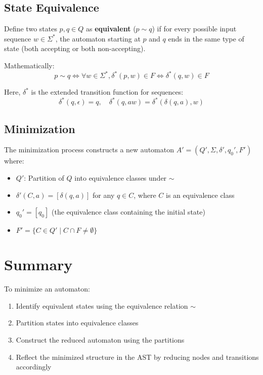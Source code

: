 \documentclass{article}
\begin{document}
\subsection{State Equivalence}
Define two states $p, q \in Q$ as \textbf{equivalent} ($p \sim q$) if for every possible input sequence $w \in \Sigma^*$, the automaton starting at $p$ and $q$ ends in the same type of state (both accepting or both non-accepting).

Mathematically:
\[
p \sim q \iff \forall w \in \Sigma^*, \delta^*(p, w) \in F \iff \delta^*(q, w) \in F
\]

Here, $\delta^*$ is the extended transition function for sequences:
\[
\delta^*(q, \epsilon) = q, \quad \delta^*(q, a w) = \delta^*(\delta(q, a), w)
\]

\subsection{Minimization}
The minimization process constructs a new automaton $A' = (Q', \Sigma, \delta', q_0', F')$ where:
\begin{itemize}
    \item $Q'$: Partition of $Q$ into equivalence classes under $\sim$
    \item $\delta'(C, a) = [\delta(q, a)]$ for any $q \in C$, where $C$ is an equivalence class
    \item $q_0' = [q_0]$ (the equivalence class containing the initial state)
    \item $F' = \{C \in Q' \mid C \cap F \neq \emptyset\}$
\end{itemize}

\section{Summary}
To minimize an automaton:
\begin{enumerate}
    \item Identify equivalent states using the equivalence relation $\sim$
    \item Partition states into equivalence classes
    \item Construct the reduced automaton using the partitions
    \item Reflect the minimized structure in the AST by reducing nodes and transitions accordingly
\end{enumerate}
\end{document}
